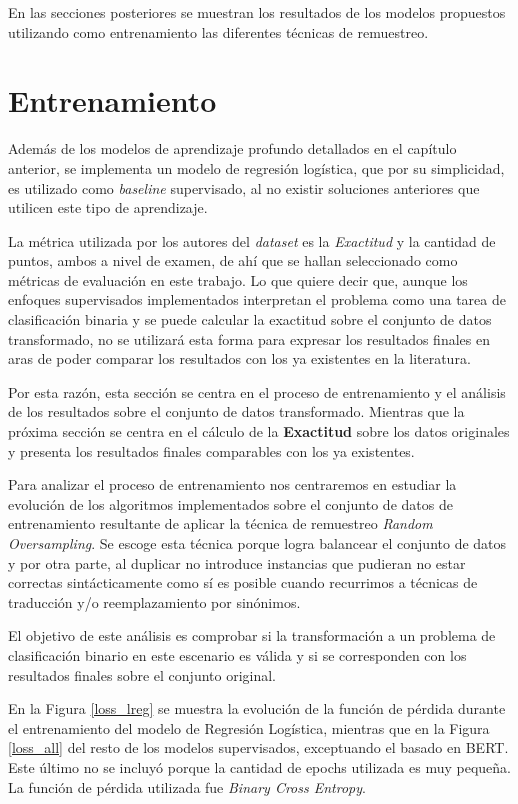 En las secciones posteriores se muestran los resultados de los modelos propuestos utilizando como entrenamiento las diferentes técnicas de remuestreo.

\section{Entrenamiento}

Además de los modelos de aprendizaje profundo detallados en el capítulo anterior, se implementa un modelo de regresión logística, que por su simplicidad, es utilizado como \textit{baseline} supervisado, al no existir soluciones anteriores que utilicen este tipo de aprendizaje.

La métrica utilizada por los autores del \textit{dataset} es la \textit{Exactitud} y la cantidad de puntos, ambos a nivel de examen, de ahí que se hallan seleccionado como métricas de evaluación en este trabajo. Lo que quiere decir que, aunque los enfoques supervisados implementados interpretan el problema como una tarea de clasificación binaria y se puede calcular la exactitud sobre el conjunto de datos transformado, no se utilizará esta forma para expresar los resultados finales en aras de poder comparar los resultados con los ya existentes en la literatura.

Por esta razón, esta sección se centra en el proceso de entrenamiento y el análisis de los resultados sobre el conjunto de datos transformado. Mientras que la próxima sección se centra en el cálculo de la \textbf{Exactitud} sobre los datos originales y presenta los resultados finales comparables con los ya existentes.

Para analizar el proceso de entrenamiento nos centraremos en estudiar la evolución de los algoritmos implementados sobre el conjunto de datos de entrenamiento resultante de aplicar la técnica de remuestreo \textit{Random Oversampling}. Se escoge esta técnica porque logra balancear el conjunto de datos y por otra parte, al duplicar no introduce instancias que pudieran no estar correctas sintácticamente como sí es posible cuando recurrimos a técnicas de traducción  y/o reemplazamiento por sinónimos.

El objetivo de este análisis es comprobar si la transformación a un problema de clasificación binario en este escenario es válida y si se corresponden con los resultados finales sobre el conjunto original.

En la Figura \ref{loss_lreg} se muestra la evolución de la función de pérdida durante el entrenamiento del modelo de Regresión Logística, mientras que en la Figura \ref{loss_all} del resto de los modelos supervisados, exceptuando el basado en BERT. Este último no se incluyó porque la cantidad de epochs utilizada es muy pequeña. La función de pérdida utilizada fue \textit{Binary Cross Entropy}.

